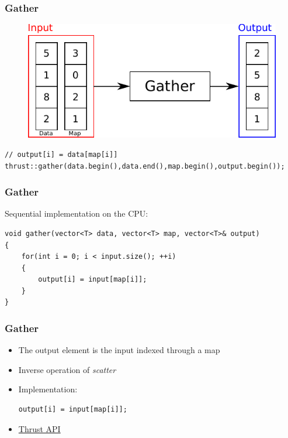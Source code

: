 \documentclass[aspectratio=169,handout]{beamer}
\begin{document}
\begin{frame}[fragile]
\frametitle{Gather}
\begin{figure}
	\centering
	\includegraphics[height=0.6\textheight]{o_gather}
\end{figure}

\begin{lstlisting}
// output[i] = data[map[i]]
thrust::gather(data.begin(),data.end(),map.begin(),output.begin());
\end{lstlisting}
\end{frame}

\begin{frame}[fragile]
	\frametitle{Gather}
	Sequential implementation on the CPU:
\begin{lstlisting}
void gather(vector<T> data, vector<T> map, vector<T>& output)
{
	for(int i = 0; i < input.size(); ++i)
	{
		output[i] = input[map[i]];
	}
}
\end{lstlisting}
\end{frame}

\begin{frame}[fragile]
\frametitle{Gather}
\begin{itemize}
	\item The output element is the input indexed through a map
	\item<2-> Inverse operation of \textit{scatter}
	\item<3-> Implementation:


\begin{lstlisting}
output[i] = input[map[i]];
\end{lstlisting}
		\item<3-> \href{https://thrust.github.io/doc/group__gathering.html}{Thrust API}
\end{itemize} 
\end{frame}
\end{document}
